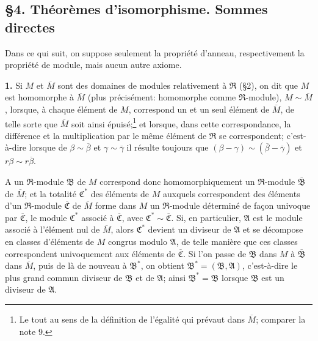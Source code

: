 \providecommand{\mR}{\mathfrak{R}}
\providecommand{\mA}{\mathfrak{A}}
\providecommand{\mB}{\mathfrak{B}}
\providecommand{\mC}{\mathfrak{C}}
\providecommand{\ma}{\mathfrak{a}}
\providecommand{\mb}{\mathfrak{b}}
\providecommand{\mc}{\mathfrak{c}}
\providecommand{\mm}{\mathfrak{m}}
\providecommand{\mo}{\mathfrak{o}}
\providecommand{\mv}{\mathfrak{v}}

\subsection*{\S{}4. Théorèmes d'isomorphisme. Sommes directes}

Dans ce qui suit, on suppose seulement la propriété d'anneau, respectivement la propriété de module, mais aucun autre axiome.

\textbf{1.} Si $M$ et $\overline M$ sont des domaines de modules relativement à $\mR$ (\S{}2), on dit que $M$ est homomorphe à $\overline M$ (plus précisément: homomorphe comme $\mR$-module), $M\sim\overline M$, lorsque, à chaque élément de $M$, correspond un et un seul élément de $\overline M$, de telle sorte que $\overline M$ soit ainsi épuisé;\footnote{Le tout au sens de la définition de l'égalité qui prévaut dans $\overline M$; comparer la note 9.} et lorsque, dans cette correspondance, la différence et la multiplication par le même élément de $\mR$ se correspondent; c'est-à-dire lorsque de $\beta\sim\overline\beta$ et $\gamma\sim\overline\gamma$ il résulte toujours que $(\beta-\gamma)\sim(\overline\beta-\overline\gamma)$ et $r\beta\sim r\overline\beta$.

A un $\mR$-module $\mB$ de $M$ correspond donc homomorphiquement un $\mR$-module $\overline{\mB}$ de $\overline M$; et la totalité $\mC^*$ des éléments de $M$ auxquels correspondent des éléments d'un $\mR$-module $\overline{\mC}$ de $\overline M$ forme dans $M$ un $\mR$-module déterminé de façon univoque par $\overline{\mC}$, le module $\mC^*$ associé à $\overline{\mC}$, avec $\mC^*\sim\overline{\mC}$. Si, en particulier, $\mA$ est le module associé à l'élément nul de $\overline M$, alors $\mC^*$ devient un diviseur de $\mA$ et se décompose en classes d'éléments de $M$ congrus modulo $\mA$, de telle manière que ces classes correspondent univoquement aux éléments de $\overline{\mC}$. Si l'on passe de $\mB$ dans $M$ à $\overline{\mB}$ dans $\overline M$, puis de là de nouveau à $\mB^*$, on obtient $\mB^*=(\mB,\mA)$, c'est-à-dire le plus grand commun diviseur de $\mB$ et de $\mA$; ainsi $\mB^*=\mB$ lorsque $\mB$ est un diviseur de $\mA$.


